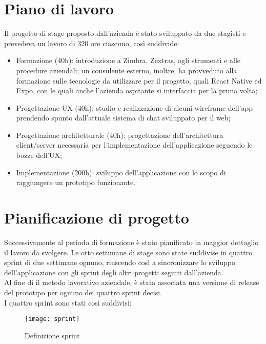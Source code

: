 \section{Piano di lavoro}
Il progetto di stage proposto dall'azienda è stato sviluppato da due stagisti e prevedeva un lavoro di 320 ore ciascuno, così suddivide:
\begin{itemize}
	\item Formazione (40h): introduzione a Zimbra, Zextras, agli strumenti e alle procedure aziendali; un consulente esterno, inoltre, ha provveduto alla formazione sulle tecnologie da utilizzare per il progetto, quali React Native ed Expo, con le quali anche l'azienda ospitante si interfaccia per la prima volta;
	\item  Progettazione UX (40h): studio e realizzazione di alcuni wireframe dell'app prendendo spunto dall’attuale sistema di chat sviluppato per il web;
	\item Progettazione architetturale (40h): progettazione dell’architettura client/server necessaria per l’implementazione dell'applicazione seguendo le bozze dell’UX;
	\item Implementazione (200h): sviluppo dell’applicazione con lo scopo di raggiungere un prototipo funzionante.
	
\end{itemize}

\section{Pianificazione di progetto}
Successivamente al periodo di formazione è stato pianificato in maggior dettaglio il lavoro da svolgere. Le otto settimane di stage sono state suddivise in quattro sprint di due settimane ognuno, riuscendo così a sincronizzare lo sviluppo dell'applicazione con gli sprint degli altri progetti seguiti dall'azienda. \\ Al fine di  il metodo lavorativo aziendale, è stata associata una versione di release del prototipo per ognuno dei quattro sprint decisi.  \\
I quattro sprint sono stati così suddivisi:
\begin{figure}[H] 
	\centering
	\texttt{[image: sprint]}
	\caption{Definizione sprint}
	\label{fig:sprint}
\end{figure}



